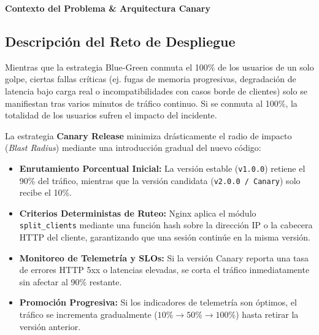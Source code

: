 \documentclass[10pt,letterpaper]{article}
\newcommand{\sectionBadge}[1]{%
  \refstepcounter{section}%
  \vspace{0.16cm}%
  \noindent%
  \colorbox{icesiBlue}{\color{white}\rule[-0.08cm]{0pt}{0.42cm}\hspace{0.16cm}\textbf{\normalsize \thesection}\hspace{0.16cm}}%
  \hspace{0.18cm}%
  {\fontsize{9.5}{12}\selectfont\textbf{\color{icesiDark}#1}}\\[-0.10cm]%
  \noindent{\color{icesiDark}\rule{\textwidth}{0.8pt}}\vspace{0.06cm}%
}
\begin{document}
\vspace{0.10cm}

\sectionBadge{Contexto del Problema \& Arquitectura Canary}

\subsection{Descripción del Reto de Despliegue}
Mientras que la estrategia Blue-Green conmuta el 100\% de los usuarios de un solo golpe, ciertas fallas críticas (ej. fugas de memoria progresivas, degradación de latencia bajo carga real o incompatibilidades con casos borde de clientes) solo se manifiestan tras varios minutos de tráfico continuo. Si se conmuta al 100\%, la totalidad de los usuarios sufren el impacto del incidente.

La estrategia \textbf{Canary Release} minimiza drásticamente el radio de impacto (\textit{Blast Radius}) mediante una introducción gradual del nuevo código:
\begin{itemize}[itemsep=1pt]
  \item \textbf{Enrutamiento Porcentual Inicial:} La versión estable (\texttt{v1.0.0}) retiene el 90\% del tráfico, mientras que la versión candidata (\texttt{v2.0.0 / Canary}) solo recibe el 10\%.
  \item \textbf{Criterios Deterministas de Ruteo:} Nginx aplica el módulo \texttt{split\_clients} mediante una función hash sobre la dirección IP o la cabecera HTTP del cliente, garantizando que una sesión continúe en la misma versión.
  \item \textbf{Monitoreo de Telemetría y SLOs:} Si la versión Canary reporta una tasa de errores HTTP 5xx o latencias elevadas, se corta el tráfico inmediatamente sin afectar al 90\% restante.
  \item \textbf{Promoción Progresiva:} Si los indicadores de telemetría son óptimos, el tráfico se incrementa gradualmente ($10\% \rightarrow 50\% \rightarrow 100\%$) hasta retirar la versión anterior.
\end{itemize}
\end{document}
